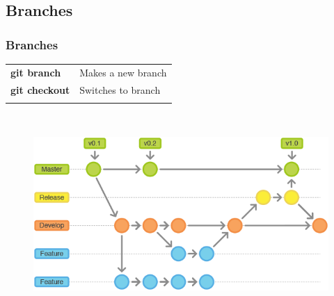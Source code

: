     \subsection{Branches}
    \begin{frame} 
		\frametitle{Branches}
        \begin{tabularx}{\linewidth}{lX}
        	\textbf{git branch} & Makes a new branch \\ \vspace{0.05cm}
            \textbf{git checkout} & Switches to branch \\ \vspace{0.05cm}
        \end{tabularx} \\
        \begin{figure}
        	\centering
        	\includegraphics[width=0.9\linewidth]{"res/git_branches2"}
        \end{figure}
	\end{frame}

